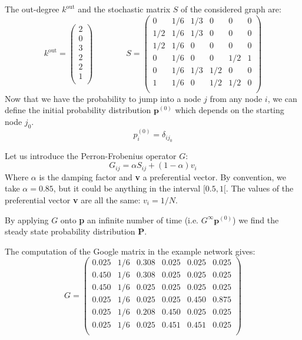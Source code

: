 The out-degree $k^{\text{out}}$ and the stochastic matrix $S$ of the considered graph are:
\[  
    k^{\text{out}} = \begin{pmatrix}
        2\\
        0\\
        3\\
        2\\
        2\\
        1\\
    \end{pmatrix}
    \qquad \qquad
    S = \begin{pmatrix}
        0 & 1/6 & 1/3 & 0 & 0 & 0\\
        1/2 & 1/6 & 1/3 & 0 & 0 & 0\\
        1/2 & 1/6 & 0 & 0 & 0 & 0\\
        0 & 1/6 & 0 & 0 & 1/2 & 1\\
        0 & 1/6 & 1/3 & 1/2 & 0 & 0\\
        1 & 1/6 & 0 & 1/2 & 1/2 & 0\\
    \end{pmatrix}
\]
Now that we have the probability to jump into a node $j$ from any node $i$, we can define the initial probability distribution $\mathbf{p}^{(0)}$ which depends on the starting node $j_0$.
\begin{equation}
    p_i^{(0)} = \delta_{ij_0}
\end{equation}

Let us introduce the Perron-Frobenius operator $G$:
\begin{equation}
    G_{ij} = \alpha S_{ij} + (1 - \alpha) v_i
\end{equation}
Where $\alpha$ is the damping factor and \textbf{v} a preferential vector. By convention, we take $\alpha = \num{0.85}$, but it could be anything in the interval $[0.5, 1[$. The values of the preferential vector \textbf{v} are all the same: $v_i = 1/N$.

By applying $G$ onto \textbf{p} an infinite number of time (i.e. $G^{\infty}\mathbf{p}^{(0)}$) we find the steady state probability distribution \textbf{P}.

The computation of the Google matrix in the example network gives:
\begin{equation}
    G = \begin{pmatrix}
        0.025 & 1/6 & 0.308 & 0.025 & 0.025 & 0.025\\
        0.450 & 1/6 & 0.308 & 0.025 & 0.025 & 0.025\\
        0.450 & 1/6 & 0.025 & 0.025 & 0.025 & 0.025\\
        0.025 & 1/6 & 0.025 & 0.025 & 0.450 & 0.875\\
        0.025 & 1/6 & 0.208 & 0.450 & 0.025 & 0.025\\
        0.025 & 1/6 & 0.025 & 0.451 & 0.451 & 0.025\\
    \end{pmatrix}
\end{equation}

